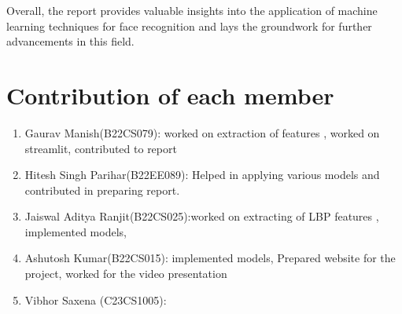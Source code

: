 \documentclass[a4paper]{article}
\theoremstyle{plain}
\theoremstyle{definition}
\begin{document}
Overall, the report provides valuable insights into the application of machine learning techniques for face recognition and lays the groundwork for further advancements in this field.\vspace{8pt}
	

	
	
	
	\appendix
	
	\section{Contribution of each member}
	\label{sec:contribution}
	\begin{enumerate}
	\item Gaurav Manish(B22CS079): worked on extraction of features , worked on streamlit, contributed to report
	\item Hitesh Singh Parihar(B22EE089): Helped in applying various models and contributed in preparing report.
 \item Jaiswal Aditya Ranjit(B22CS025):worked on extracting of LBP features , implemented models,  
  \item Ashutosh Kumar(B22CS015): implemented models, Prepared website for the project, worked for the video presentation
  \item Vibhor Saxena (C23CS1005): 
	
	\end{enumerate}
    	
	
\end{document}
